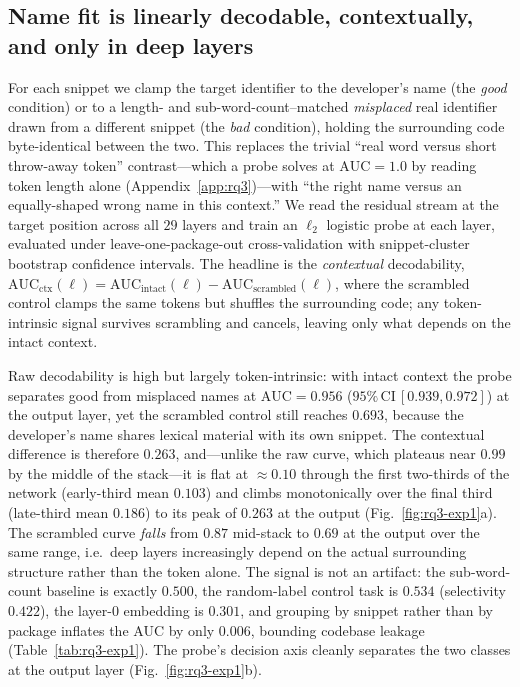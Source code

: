 \subsection{Name fit is linearly decodable, contextually, and only in deep layers}
\label{sec:rq3-depth}
For each snippet we clamp the target identifier to the developer's name (the
\emph{good} condition) or to a length- and sub-word-count--matched
\emph{misplaced} real identifier drawn from a different snippet (the \emph{bad}
condition), holding the surrounding code byte-identical between the two. This
replaces the trivial ``real word versus short throw-away token'' contrast---which
a probe solves at $\mathrm{AUC}=1.0$ by reading token length alone
(Appendix~\ref{app:rq3})---with ``the right name versus an equally-shaped wrong
name in this context.'' We read the residual stream at the target position across
all $29$ layers and train an $\ell_2$ logistic probe at each layer, evaluated
under leave-one-package-out cross-validation with snippet-cluster bootstrap
confidence intervals. The headline is the \emph{contextual} decodability,
$\mathrm{AUC}_{\text{ctx}}(\ell)=\mathrm{AUC}_{\text{intact}}(\ell)-
\mathrm{AUC}_{\text{scrambled}}(\ell)$, where the scrambled control clamps the
same tokens but shuffles the surrounding code; any token-intrinsic signal
survives scrambling and cancels, leaving only what depends on the intact context.

Raw decodability is high but largely token-intrinsic: with intact context the
probe separates good from misplaced names at $\mathrm{AUC}=0.956$
($95\%\,\mathrm{CI}\,[0.939,0.972]$) at the output layer, yet the scrambled
control still reaches $0.693$, because the developer's name shares lexical
material with its own snippet. The contextual difference is therefore $0.263$,
and---unlike the raw curve, which plateaus near $0.99$ by the middle of the
stack---it is flat at $\approx0.10$ through the first two-thirds of the network
(early-third mean $0.103$) and climbs monotonically over the final third
(late-third mean $0.186$) to its peak of $0.263$ at the output
(Fig.~\ref{fig:rq3-exp1}a). The scrambled curve \emph{falls} from $0.87$
mid-stack to $0.69$ at the output over the same range, i.e.\ deep layers
increasingly depend on the actual surrounding structure rather than the token
alone. The signal is not an artifact: the sub-word-count baseline is exactly
$0.500$, the random-label control task is $0.534$ (selectivity $0.422$), the
layer-0 embedding is $0.301$, and grouping by snippet rather than by package
inflates the AUC by only $0.006$, bounding codebase leakage
(Table~\ref{tab:rq3-exp1}). The probe's decision axis cleanly separates the two
classes at the output layer (Fig.~\ref{fig:rq3-exp1}b).

